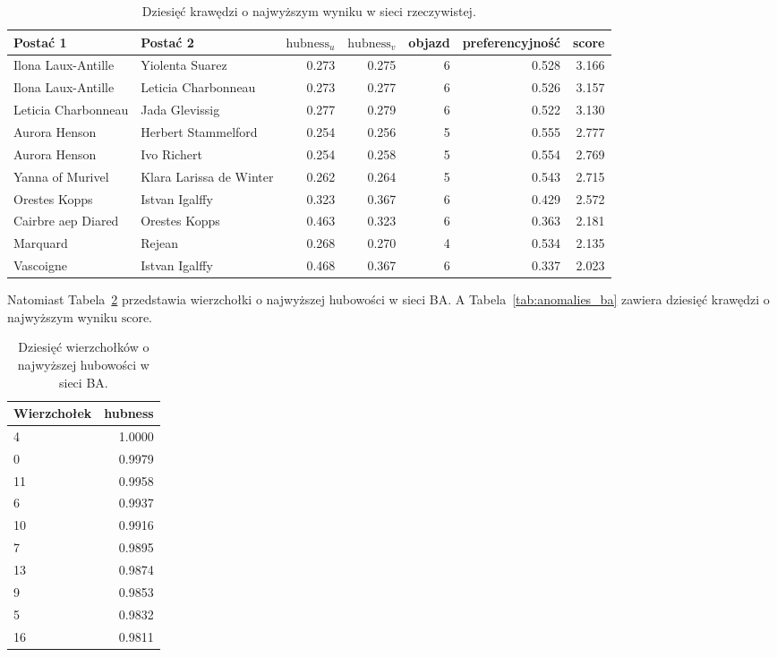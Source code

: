 \documentclass[12pt]{article}
\begin{document}
\begin{table}[H]
    \centering
    \footnotesize
    \begin{tabular}{llrrrrr}
        \toprule
        Postać 1 & Postać 2 & $\mathrm{hubness}_u$ & $\mathrm{hubness}_v$ & objazd & preferencyjność & score \\
        \midrule
        Ilona Laux-Antille  & Yiolenta Suarez         & 0.273 & 0.275 & 6 & 0.528 & 3.166 \\
        Ilona Laux-Antille  & Leticia Charbonneau     & 0.273 & 0.277 & 6 & 0.526 & 3.157 \\
        Leticia Charbonneau & Jada Glevissig          & 0.277 & 0.279 & 6 & 0.522 & 3.130 \\
        Aurora Henson       & Herbert Stammelford     & 0.254 & 0.256 & 5 & 0.555 & 2.777 \\
        Aurora Henson       & Ivo Richert             & 0.254 & 0.258 & 5 & 0.554 & 2.769 \\
        Yanna of Murivel    & Klara Larissa de Winter & 0.262 & 0.264 & 5 & 0.543 & 2.715 \\
        Orestes Kopps       & Istvan Igalffy          & 0.323 & 0.367 & 6 & 0.429 & 2.572 \\
        Cairbre aep Diared  & Orestes Kopps           & 0.463 & 0.323 & 6 & 0.363 & 2.181 \\
        Marquard            & Rejean                  & 0.268 & 0.270 & 4 & 0.534 & 2.135 \\
        Vascoigne           & Istvan Igalffy          & 0.468 & 0.367 & 6 & 0.337 & 2.023 \\
        \bottomrule
    \end{tabular}
    \caption{Dziesięć krawędzi o najwyższym wyniku w sieci rzeczywistej.}
    \label{tab:anomalies_org}
\end{table}

Natomiast Tabela~\ref{tab:hubs_ba} przedstawia wierzchołki o najwyższej hubowości w sieci BA. A Tabela~\ref{tab:anomalies_ba} zawiera dziesięć krawędzi o najwyższym wyniku $\mathrm{score}$.

\begin{table}[H]
    \centering
    \begin{tabular}{lr}
        \toprule
        Wierzchołek & hubness \\
        \midrule
        4  & 1.0000 \\
        0  & 0.9979 \\
        11 & 0.9958 \\
        6  & 0.9937 \\
        10 & 0.9916 \\
        7  & 0.9895 \\
        13 & 0.9874 \\
        9  & 0.9853 \\
        5  & 0.9832 \\
        16 & 0.9811 \\
        \bottomrule
    \end{tabular}
    \caption{Dziesięć wierzchołków o najwyższej hubowości w sieci BA.}
    \label{tab:hubs_ba}
\end{table}
\end{document}
